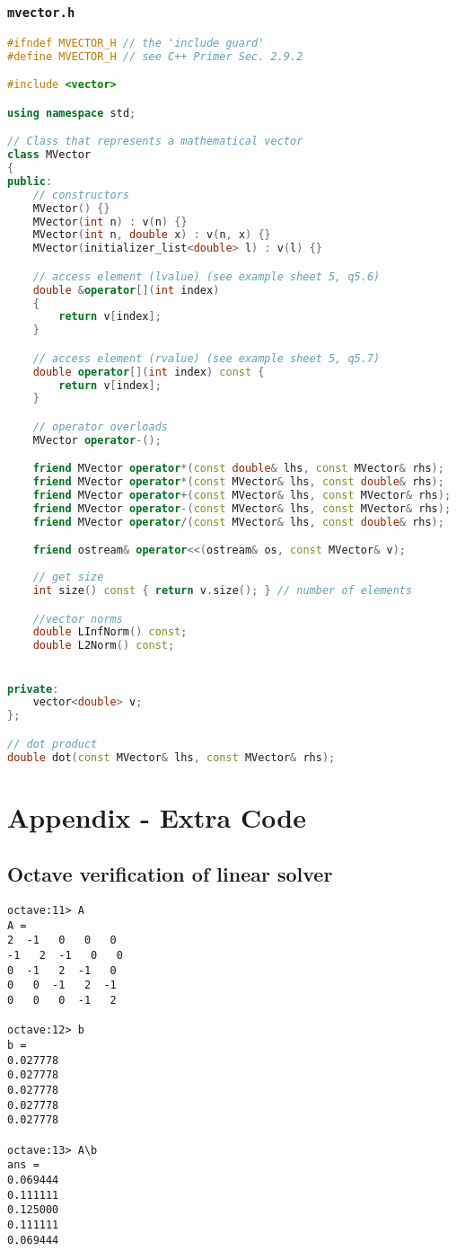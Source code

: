 \documentclass{article}
\begin{document}
\subsubsection{\texttt{mvector.h}}
\begin{lstlisting}[language=c++]
#ifndef MVECTOR_H // the 'include guard'
#define MVECTOR_H // see C++ Primer Sec. 2.9.2

#include <vector>

using namespace std;

// Class that represents a mathematical vector
class MVector
{
public:
	// constructors
	MVector() {}
	MVector(int n) : v(n) {}
	MVector(int n, double x) : v(n, x) {}
	MVector(initializer_list<double> l) : v(l) {}

	// access element (lvalue) (see example sheet 5, q5.6)
	double &operator[](int index) 
	{ 
		return v[index];
	}

	// access element (rvalue) (see example sheet 5, q5.7)
	double operator[](int index) const {
		return v[index]; 
	}

	// operator overloads
	MVector operator-();

	friend MVector operator*(const double& lhs, const MVector& rhs);
	friend MVector operator*(const MVector& lhs, const double& rhs);
	friend MVector operator+(const MVector& lhs, const MVector& rhs);
	friend MVector operator-(const MVector& lhs, const MVector& rhs);
	friend MVector operator/(const MVector& lhs, const double& rhs);

	friend ostream& operator<<(ostream& os, const MVector& v);
	
	// get size
	int size() const { return v.size(); } // number of elements

	//vector norms
	double LInfNorm() const;
	double L2Norm() const;


private:
	vector<double> v;
};

// dot product
double dot(const MVector& lhs, const MVector& rhs);
\end{lstlisting}

\section{Appendix - Extra Code}

\subsection{Octave verification of linear solver}
\label{apd:octave_5}
\begin{verbatim}
octave:11> A
A =
2  -1   0   0   0
-1   2  -1   0   0
0  -1   2  -1   0
0   0  -1   2  -1
0   0   0  -1   2

octave:12> b
b =
0.027778
0.027778
0.027778
0.027778
0.027778

octave:13> A\b
ans =
0.069444
0.111111
0.125000
0.111111
0.069444
\end{verbatim}
\end{document}
